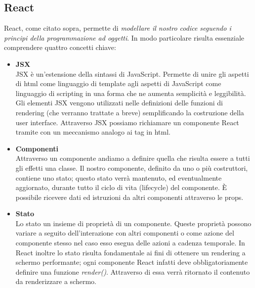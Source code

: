 \subsection{React}
\noindent React, come citato sopra, permette di \emph{modellare il nostro codice seguendo i principi della programmazione ad oggetti}.
          In modo particolare risulta essenziale comprendere quattro concetti chiave:
\begin{itemize}
    \item  \textbf{JSX}\\
    JSX \cite{introduzione_jsx_react} è un'estensione della sintassi di JavaScript.\newline
    Permette di unire gli aspetti di html come linguaggio di template agli aspetti di JavaScript come linguaggio di scripting in una forma che ne aumenta semplicità e leggibilità.\newline
    Gli elementi JSX vengono utilizzati nelle definizioni delle funzioni di rendering (che verranno trattate a breve) semplificando la costruzione della user interface.\newline
    Attraverso JSX possiamo richiamare un componente React tramite con un meccanismo analogo ai tag in html.
    \item  \textbf{Componenti}\\
    Attraverso un componente \cite{componente_react} andiamo a definire quella che risulta essere a tutti gli effetti una classe.\newline
    Il nostro componente, definito da uno o più costruttori, contiene uno stato; questo stato verrà mantenuto, ed eventualmente aggiornato, durante tutto il ciclo di vita (lifecycle) del componente.\newline
    È possibile ricevere dati ed istruzioni da altri componenti attraverso le props.    
    \item \textbf{Stato}\\
    Lo stato \cite{state_e_lifecycle_react} un insieme di proprietà di un componente.\newline
    Queste proprietà possono variare a seguito dell'interazione con altri componenti o come azione del componente stesso nel caso esso esegua delle azioni a cadenza temporale.\newline
    In React inoltre lo stato risulta fondamentale ai fini di ottenere un rendering a schermo performante; ogni componente React infatti deve obbligatoriamente definire una funzione \emph{render()}.\newline
    Attraverso di essa verrà ritornato il contenuto da renderizzare a schermo.\newline 

\end{itemize}
